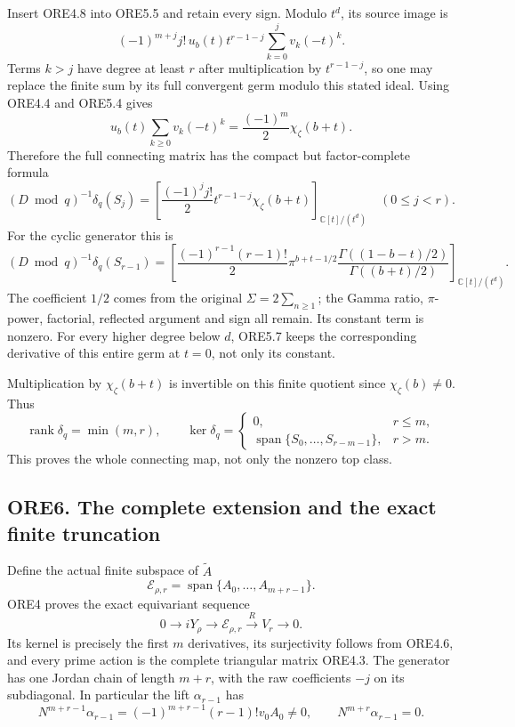 Insert ORE4.8 into ORE5.5 and retain every sign. Modulo \(t^d\), its
source image is \[
(-1)^{m+j}j!\,u_b(t)t^{r-1-j}
\sum_{k=0}^j v_k(-t)^k.
\] Terms \(k>j\) have degree at least \(r\) after multiplication by
\(t^{r-1-j}\), so one may replace the finite sum by its full convergent
germ modulo this stated ideal. Using ORE4.4 and ORE5.4 gives \[
u_b(t)\sum_{k\ge0}v_k(-t)^k
=\frac{(-1)^m}{2}\chi_\zeta(b+t).
\] Therefore the full connecting matrix has the compact but
factor-complete formula \[
\boxed{
(D\bmod q)^{-1}\delta_q(S_j)
=
\left[\frac{(-1)^j j!}{2}
t^{r-1-j}\chi_\zeta(b+t)\right]_{\mathbb C[t]/(t^d)}
\quad(0\le j<r).}
\tag{ORE5.6}
\] For the cyclic generator this is \[
\boxed{
(D\bmod q)^{-1}\delta_q(S_{r-1})
=\left[\frac{(-1)^{r-1}(r-1)!}{2}
\pi^{b+t-1/2}
\frac{\Gamma((1-b-t)/2)}{\Gamma((b+t)/2)}
\right]_{\mathbb C[t]/(t^d)}.}
\tag{ORE5.7}
\] The coefficient \(1/2\) comes from the original
\(\Sigma=2\sum_{n\ge1}\); the Gamma ratio, \(\pi\)-power, factorial,
reflected argument and sign all remain. Its constant term is nonzero.
For every higher degree below \(d\), ORE5.7 keeps the corresponding
derivative of this entire germ at \(t=0\), not only its constant.

Multiplication by \(\chi_\zeta(b+t)\) is invertible on this finite
quotient since \(\chi_\zeta(b)\ne0\). Thus \[
\operatorname{rank}\delta_q=\min(m,r),\qquad
\ker\delta_q=
\begin{cases}
0,&r\le m,\\
\operatorname{span}\{S_0,\ldots,S_{r-m-1}\},&r>m.
\end{cases}
\tag{ORE5.8}
\] This proves the whole connecting map, not only the nonzero top class.

\subsection{ORE6. The complete extension and the exact finite
truncation}\label{ore6.-the-complete-extension-and-the-exact-finite-truncation}

Define the actual finite subspace of \(\widetilde A\) \[
\mathcal E_{\rho,r}=\operatorname{span}
\{A_0,\ldots,A_{m+r-1}\}.
\] ORE4 proves the exact equivariant sequence \[
0\longrightarrow iY_\rho
\longrightarrow\mathcal E_{\rho,r}
\xrightarrow{R}V_r\longrightarrow0.
\tag{ORE6.1}
\] Its kernel is precisely the first \(m\) derivatives, its surjectivity
follows from ORE4.6, and every prime action is the complete triangular
matrix ORE4.3. The generator has one Jordan chain of length \(m+r\),
with the raw coefficients \(-j\) on its subdiagonal. In particular the
lift \(\alpha_{r-1}\) has \[
N^{m+r-1}\alpha_{r-1}
=(-1)^{m+r-1}(r-1)!v_0 A_0\ne0,\qquad
N^{m+r}\alpha_{r-1}=0.
\tag{ORE6.2}
\]

